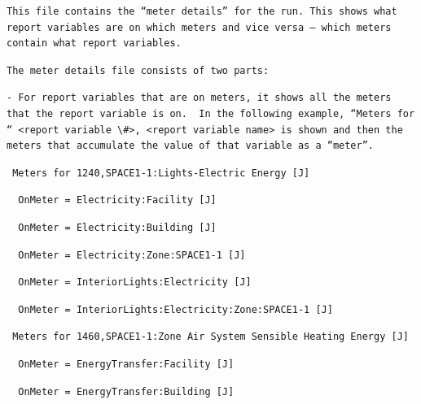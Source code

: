 \begin{lstlisting}
This file contains the “meter details” for the run. This shows what report variables are on which meters and vice versa – which meters contain what report variables.
\end{lstlisting}

\begin{lstlisting}
The meter details file consists of two parts:
\end{lstlisting}

\begin{lstlisting}
- For report variables that are on meters, it shows all the meters that the report variable is on.  In the following example, “Meters for “ <report variable \#>, <report variable name> is shown and then the meters that accumulate the value of that variable as a “meter”.
\end{lstlisting}

\begin{lstlisting}
 Meters for 1240,SPACE1-1:Lights-Electric Energy [J]
\end{lstlisting}

\begin{lstlisting}
  OnMeter = Electricity:Facility [J]
\end{lstlisting}

\begin{lstlisting}
  OnMeter = Electricity:Building [J]
\end{lstlisting}

\begin{lstlisting}
  OnMeter = Electricity:Zone:SPACE1-1 [J]
\end{lstlisting}

\begin{lstlisting}
  OnMeter = InteriorLights:Electricity [J]
\end{lstlisting}

\begin{lstlisting}
  OnMeter = InteriorLights:Electricity:Zone:SPACE1-1 [J]
\end{lstlisting}

\begin{lstlisting}
 Meters for 1460,SPACE1-1:Zone Air System Sensible Heating Energy [J]
\end{lstlisting}

\begin{lstlisting}
  OnMeter = EnergyTransfer:Facility [J]
\end{lstlisting}

\begin{lstlisting}
  OnMeter = EnergyTransfer:Building [J]
\end{lstlisting}

